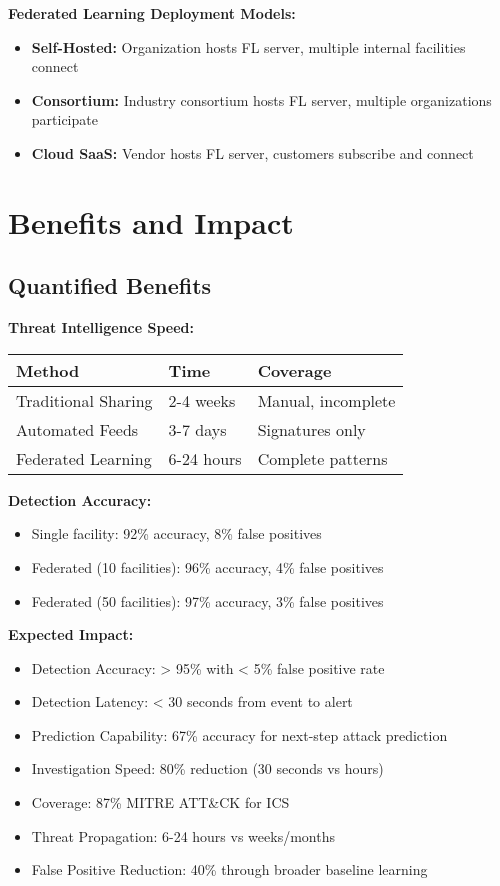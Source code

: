 \documentclass[12pt,a4paper]{article}
\begin{document}
\textbf{Federated Learning Deployment Models:}
\begin{itemize}[leftmargin=1cm,itemsep=0pt]
    \item \textbf{Self-Hosted:} Organization hosts FL server, multiple internal facilities connect
    \item \textbf{Consortium:} Industry consortium hosts FL server, multiple organizations participate
    \item \textbf{Cloud SaaS:} Vendor hosts FL server, customers subscribe and connect
\end{itemize}

\section{Benefits and Impact}

\subsection{Quantified Benefits}

\textbf{Threat Intelligence Speed:}
\begin{center}
\begin{tabular}{|p{4cm}|p{2.5cm}|p{3cm}|}
\hline
\textbf{Method} & \textbf{Time} & \textbf{Coverage}\\
\hline
Traditional Sharing & 2-4 weeks & Manual, incomplete\\
\hline
Automated Feeds & 3-7 days & Signatures only\\
\hline
Federated Learning & 6-24 hours & Complete patterns\\
\hline
\end{tabular}
\end{center}

\textbf{Detection Accuracy:}
\begin{itemize}[leftmargin=1cm,itemsep=0pt]
    \item Single facility: 92\% accuracy, 8\% false positives
    \item Federated (10 facilities): 96\% accuracy, 4\% false positives
    \item Federated (50 facilities): 97\% accuracy, 3\% false positives
\end{itemize}

\textbf{Expected Impact:}
\begin{itemize}[leftmargin=1cm,itemsep=0pt]
    \item Detection Accuracy: > 95\% with < 5\% false positive rate
    \item Detection Latency: < 30 seconds from event to alert
    \item Prediction Capability: 67\% accuracy for next-step attack prediction
    \item Investigation Speed: 80\% reduction (30 seconds vs hours)
    \item Coverage: 87\% MITRE ATT\&CK for ICS
    \item Threat Propagation: 6-24 hours vs weeks/months
    \item False Positive Reduction: 40\% through broader baseline learning
\end{itemize}
\end{document}
